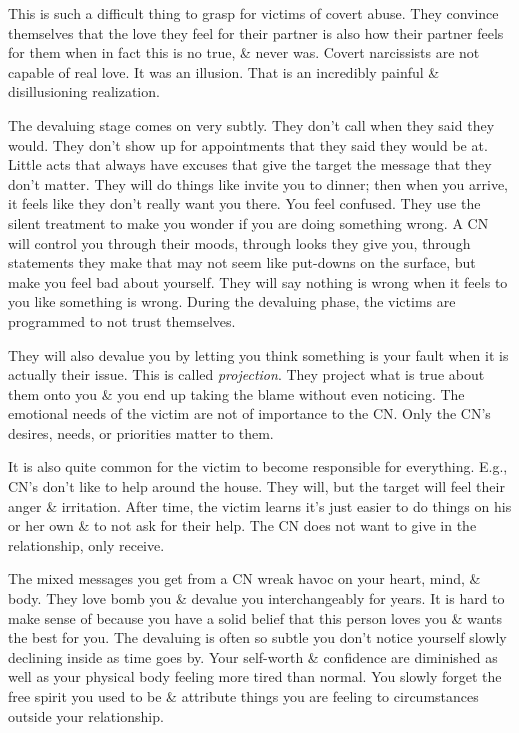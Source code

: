 \documentclass{article}
\numberwithin{equation}{section}
\begin{document}
This is such a difficult thing to grasp for victims of covert abuse. They convince themselves that the love they feel for their partner is also how their partner feels for them when in fact this is no true, \& never was. Covert narcissists are not capable of real love. It was an illusion. That is an incredibly painful \& disillusioning realization.

The devaluing stage comes on very subtly. They don't call when they said they would. They don't show up for appointments that they said they would be at. Little acts that always have excuses that give the target the message that they don't matter. They will do things like invite you to dinner; then when you arrive, it feels like they don't really want you there. You feel confused. They use the silent treatment to make you wonder if you are doing something wrong. A CN will control you through their moods, through looks they give you, through statements they make that may not seem like put-downs on the surface, but make you feel bad about yourself. They will say nothing is wrong when it feels to you like something is wrong. During the devaluing phase, the victims are programmed to not trust themselves.

They will also devalue you by letting you think something is your fault when it is actually their issue. This is called \textit{projection}. They project what is true about them onto you \& you end up taking the blame without even noticing. The emotional needs of the victim are not of importance to the CN. Only the CN's desires, needs, or priorities matter to them.

It is also quite common for the victim to become responsible for everything. E.g., CN's don't like to help around the house. They will, but the target will feel their anger \& irritation. After time, the victim learns it's just easier to do things on his or her own \& to not ask for their help. The CN does not want to give in the relationship, only receive.

The mixed messages you get from a CN wreak havoc on your heart, mind, \& body. They love bomb you \& devalue you interchangeably for years. It is hard to make sense of because you have a solid belief that this person loves you \& wants the best for you. The devaluing is often so subtle you don't notice yourself slowly declining inside as time goes by. Your self-worth \& confidence are diminished as well as your physical body feeling more tired than normal. You slowly forget the free spirit you used to be \& attribute things you are feeling to circumstances outside your relationship.
\end{document}
